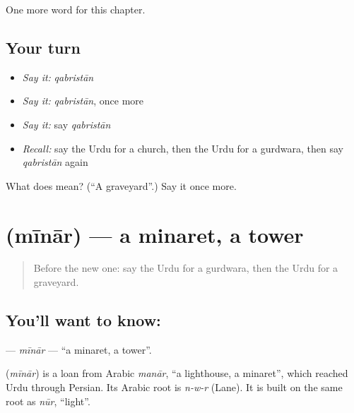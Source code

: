 \begin{grammarlens}[title={What you've built}]
One more word for this chapter.
\end{grammarlens}

\subsection*{Your turn}
\begin{itemize}
\raggedright
  \item \emph{Say it:} \emph{qabristān}
  \item \emph{Say it:} \emph{qabristān}, once more
  \item \emph{Say it:} say \emph{qabristān}
  \item \emph{Recall:} say the Urdu for a church, then the Urdu for a gurdwara, then say \emph{qabristān} again
\end{itemize}

\begin{tcolorbox}[breakable,colback=teal!4,colframe=teal!35!black,title={Before you move on}]
What does  mean? (\textquotedblleft{}A graveyard\textquotedblright{}.) Say it once more.
\end{tcolorbox}
\section[\texorpdfstring{\ur{مینار} (mīnār)}{مینار (mīnār)}]{ (mīnār) — a minaret, a tower}

\label{lesson:UR-C191-minar}



\begin{quote}
Before the new one: say the Urdu for a gurdwara, then the Urdu for a graveyard.
\end{quote}

\subsection*{You'll want to know: }
\textbf{} — \emph{mīnār} — \textquotedblleft{}a minaret, a tower\textquotedblright{}.

\begin{cousinweb}
\textbf{} (\emph{mīnār}) is a loan from Arabic \emph{manār}, \textquotedblleft{}a lighthouse, a minaret\textquotedblright{}, which reached Urdu through Persian. Its Arabic root is \emph{n-w-r} (Lane). It is built on the same root as \emph{nūr}, \textquotedblleft{}light\textquotedblright{}.
\end{cousinweb}


